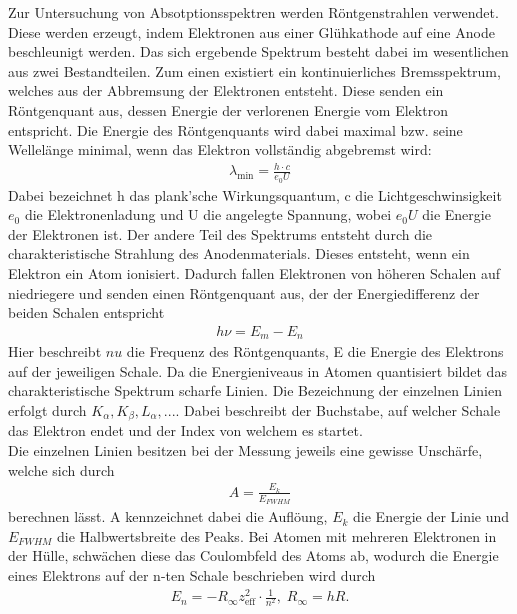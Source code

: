 Zur Untersuchung von Absotptionsspektren werden Röntgenstrahlen verwendet. Diese werden erzeugt, indem
Elektronen aus einer Glühkathode auf eine Anode beschleunigt werden. Das sich ergebende Spektrum 
besteht dabei im wesentlichen aus zwei Bestandteilen. Zum einen existiert ein kontinuierliches Bremsspektrum,
welches aus der Abbremsung der Elektronen entsteht. Diese senden ein Röntgenquant aus, dessen Energie
der verlorenen Energie vom Elektron entspricht. Die Energie des Röntgenquants wird dabei maximal 
bzw. seine Wellelänge minimal, wenn das Elektron vollständig abgebremst wird: \cite{V602}
\begin{align}
\lambda _{\text{min}}=\frac{h \cdot c}{e_0 U} \label{eq:1}
\end{align}
Dabei bezeichnet h das plank'sche Wirkungsquantum, c die Lichtgeschwinsigkeit $e_0$ die
Elektronenladung und U die angelegte Spannung, wobei $e_0 U$ die Energie der Elektronen ist.
Der andere Teil des Spektrums entsteht durch die charakteristische Strahlung des Anodenmaterials.
Dieses entsteht, wenn ein Elektron ein Atom ionisiert. Dadurch fallen Elektronen von höheren
Schalen auf niedriegere und senden einen Röntgenquant aus, der der Energiedifferenz
der beiden Schalen entspricht \cite{V602}
\begin{align}
    h \nu = E_m - E_n \label{eq:2}
\end{align}
Hier beschreibt $nu$ die Frequenz des Röntgenquants, E die Energie des Elektrons auf der jeweiligen Schale.
Da die Energieniveaus in Atomen quantisiert bildet das charakteristische Spektrum scharfe Linien.
Die Bezeichnung der einzelnen Linien erfolgt durch $K_{\alpha}, K_{\beta}, L_{\alpha},... $. 
Dabei beschreibt der Buchstabe, auf welcher Schale das Elektron endet und der Index von welchem
es startet.\\
Die einzelnen Linien besitzen bei der Messung jeweils eine gewisse Unschärfe, welche sich durch\cite{V602}
\begin{align}
    A=\frac{E_k}{E_{FWHM}} \label{eq:3}
\end{align}
berechnen lässt.
A kennzeichnet dabei die Auflöung, $E_k$ die Energie der Linie und $E_{FWHM} $ die Halbwertsbreite des Peaks.
Bei Atomen mit mehreren Elektronen in der Hülle, schwächen diese das Coulombfeld des Atoms ab,
wodurch die Energie eines Elektrons auf der n-ten Schale beschrieben wird durch \cite{V602}
\begin{align}
    E_n = - R_{\infty} z_{\text{eff}}^2 \cdot \frac{1}{n^2} \label{eq:4}, \; R_{\infty}=hR . 
\end{align}
